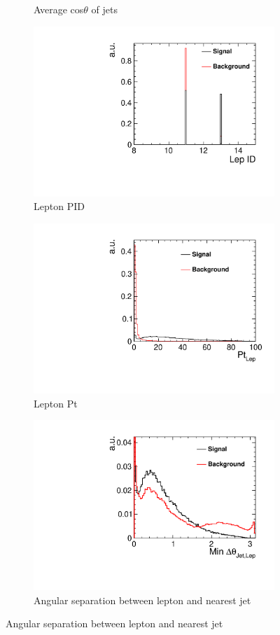 \begin{figure}[ht]
\begin{subfigure}[b]{0.5\linewidth}
    \caption{Average cos$\theta$ of jets} 
  \end{subfigure}%
  \begin{subfigure}[b]{0.5\linewidth}
    \centering
    \includegraphics[width=0.75\linewidth]{Appendix/figures/LepID} 
    \caption{Lepton PID} 
  \end{subfigure}
  \begin{subfigure}[b]{0.5\linewidth}
    \centering
    \includegraphics[width=0.75\linewidth]{Appendix/figures/LepPt} 
    \caption{Lepton Pt} 
  \end{subfigure}%
  \begin{subfigure}[b]{0.5\linewidth}
    \centering
    \includegraphics[width=0.75\linewidth]{Appendix/figures/MinJetLepAngSep} 
    \caption{Angular separation between lepton and nearest jet} 
  \end{subfigure}
\end{figure}

